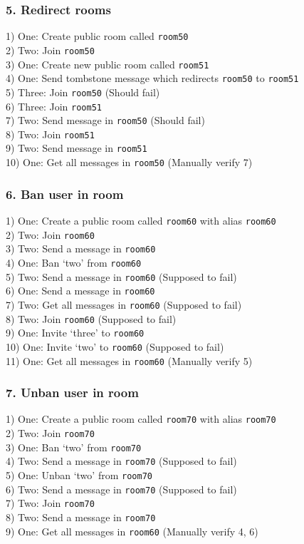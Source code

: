 \documentclass{article}
\begin{document}
\subsubsection*{5. Redirect rooms}
1) One: Create public room called \texttt{room50} \\
2) Two: Join \texttt{room50} \\
3) One: Create new public room called \texttt{room51} \\
4) One: Send tombstone message which redirects \texttt{room50} to \texttt{room51} \\
5) Three: Join \texttt{room50} (Should fail) \\
6) Three: Join \texttt{room51} \\
7) Two: Send message in \texttt{room50} (Should fail) \\
8) Two: Join \texttt{room51} \\
9) Two: Send message in \texttt{room51} \\
10) One: Get all messages in \texttt{room50} (Manually verify 7) 

\subsubsection*{6. Ban user in room}
1) One: Create a public room called \texttt{room60} with alias \texttt{room60}\\
2) Two: Join \texttt{room60} \\
3) Two: Send a message in \texttt{room60} \\
4) One: Ban `two' from \texttt{room60} \\
5) Two: Send a message in \texttt{room60} (Supposed to fail) \\
6) One: Send a message in \texttt{room60} \\
7) Two: Get all messages in \texttt{room60} (Supposed to fail) \\
8) Two: Join \texttt{room60} (Supposed to fail) \\
9) One: Invite `three' to \texttt{room60} \\
10) One: Invite `two' to \texttt{room60} (Supposed to fail) \\
11) One: Get all messages in \texttt{room60} (Manually verify 5)

\subsubsection*{7. Unban user in room}
1) One: Create a public room called \texttt{room70} with alias \texttt{room70}\\
2) Two: Join \texttt{room70} \\
3) One: Ban `two' from \texttt{room70} \\
4) Two: Send a message in \texttt{room70} (Supposed to fail) \\
5) One: Unban `two' from  \texttt{room70} \\
6)  Two: Send a message in \texttt{room70} (Supposed to fail) \\
7) Two: Join \texttt{room70} \\
8) Two: Send a message in \texttt{room70} \\
9) One: Get all messages in \texttt{room60} (Manually verify 4, 6)
\end{document}

